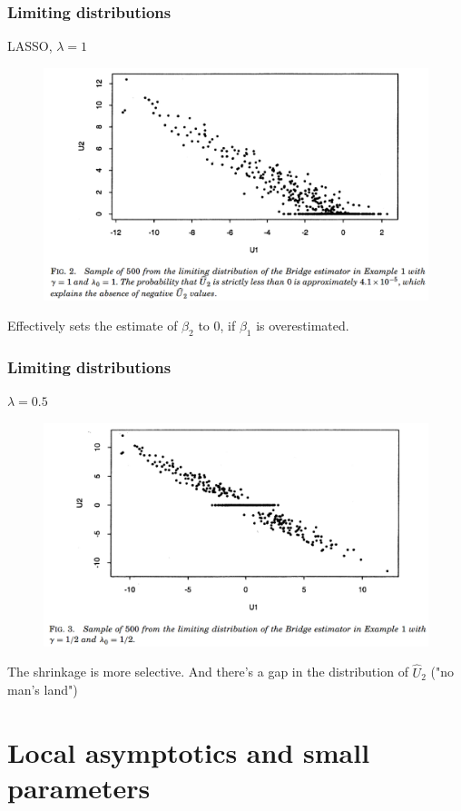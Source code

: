\documentclass{beamer}
\begin{document}
	\begin{frame}
		\frametitle{Limiting distributions}
		LASSO, $\lambda = 1$
		\begin{figure}
			\includegraphics[width=.8\linewidth]{image009.png}
		\end{figure}
		Effectively sets the estimate of $\beta_2$ to 0, if $\beta_1$ is overestimated.
	\end{frame}
	
	\begin{frame}
		\frametitle{Limiting distributions}
		$\lambda = 0.5$
		\begin{figure}
			\includegraphics[width=.8\linewidth]{image010.png}
		\end{figure}
		The shrinkage is more selective. And there's a gap in the distribution of $\hat{U}_2$ ("no man's land")
	\end{frame}
	
	\section{Local asymptotics and small parameters}
	
\end{document}
